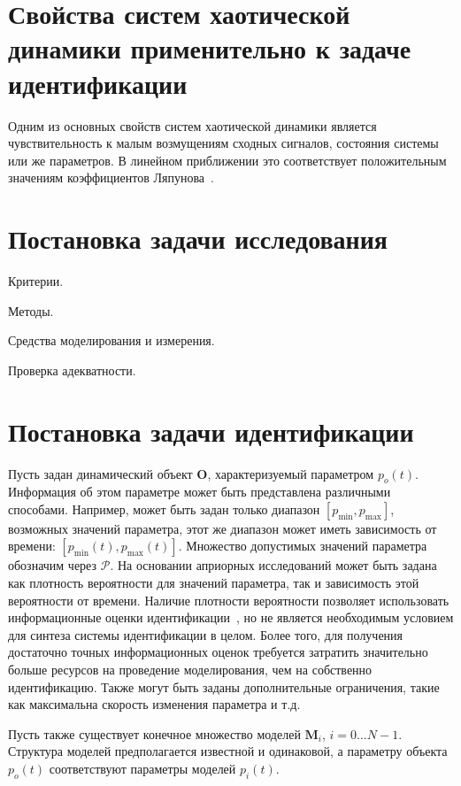 \section{Свойства систем хаотической динамики применительно к задаче идентификации}  %

Одним из основных свойств систем хаотической динамики является чувствительность
к малым возмущениям сходных сигналов, состояния системы или же параметров.
В линейном приближении это соответствует положительным значениям
коэффициентов Ляпунова~\cite{magni_theory_dyn_chaos,moon_chaotic_vibr}.



\section{Постановка задачи исследования}  %

Критерии.

Методы.

Средства моделирования и измерения.

Проверка адекватности.



\section{Постановка задачи идентификации}  %

Пусть задан динамический объект $ \mathbf{O}$, характеризуемый параметром $p_o(t)$.
Информация об этом параметре может быть представлена
различными способами. Например, может быть задан только диапазон
$[p_{\min}, p_{\max}]$,
возможных значений параметра,
этот же диапазон может иметь зависимость от времени:
$[p_{\min}(t), p_{\max}(t)]$.
Множество допустимых значений параметра обозначим через $\mathcal{P}$.
На основании априорных исследований может
быть задана как плотность вероятности для значений параметра,
так и зависимость этой вероятности от времени. Наличие плотности вероятности
позволяет использовать информационные оценки идентификации~\cite{info_cipkin,atu_asau10},
но не является необходимым условием для синтеза системы идентификации в целом.
Более того, для получения достаточно точных информационных оценок
требуется затратить значительно больше ресурсов на проведение моделирования,
чем на собственно идентификацию.
Также могут быть заданы дополнительные ограничения, такие как максимальна скорость
изменения параметра и т.д.

Пусть также существует конечное множество моделей
\label{atu:d:N}$\mathbf{M}_i$, $i=0 \ldots N-1$.
Структура моделей предполагается известной и одинаковой,
а параметру объекта $p_o(t)$ соответствуют параметры моделей $p_{i}(t)$.

